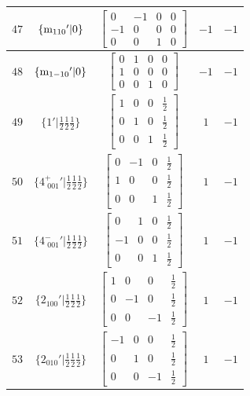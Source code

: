 \documentclass[fleqn,8pt]{jsarticle}
\begin{document}
\begin{longtable}{ccccc}
$ 47 $ & $ \{{\rm m}_{110}{}'|0\} $ & $ \begin{bmatrix} 0 & -1 & 0 & 0 \\ -1 & 0 & 0 & 0 \\ 0 & 0 & 1 & 0 \end{bmatrix} $ & $ -1 $ & $ -1 $ \\ \hline
$ 48 $ & $ \{{\rm m}_{1-10}{}'|0\} $ & $ \begin{bmatrix} 0 & 1 & 0 & 0 \\ 1 & 0 & 0 & 0 \\ 0 & 0 & 1 & 0 \end{bmatrix} $ & $ -1 $ & $ -1 $ \\ \hline
$ 49 $ & $ \{1{}'|\frac{1}{2} \frac{1}{2} \frac{1}{2}\} $ & $ \begin{bmatrix} 1 & 0 & 0 & \frac{1}{2} \\ 0 & 1 & 0 & \frac{1}{2} \\ 0 & 0 & 1 & \frac{1}{2} \end{bmatrix} $ & $ 1 $ & $ -1 $ \\ \hline
$ 50 $ & $ \{4^{+}_{\,\,001}{}'|\frac{1}{2} \frac{1}{2} \frac{1}{2}\} $ & $ \begin{bmatrix} 0 & -1 & 0 & \frac{1}{2} \\ 1 & 0 & 0 & \frac{1}{2} \\ 0 & 0 & 1 & \frac{1}{2} \end{bmatrix} $ & $ 1 $ & $ -1 $ \\ \hline
$ 51 $ & $ \{4^{-}_{\,\,001}{}'|\frac{1}{2} \frac{1}{2} \frac{1}{2}\} $ & $ \begin{bmatrix} 0 & 1 & 0 & \frac{1}{2} \\ -1 & 0 & 0 & \frac{1}{2} \\ 0 & 0 & 1 & \frac{1}{2} \end{bmatrix} $ & $ 1 $ & $ -1 $ \\ \hline
$ 52 $ & $ \{2{}_{100}{}'|\frac{1}{2} \frac{1}{2} \frac{1}{2}\} $ & $ \begin{bmatrix} 1 & 0 & 0 & \frac{1}{2} \\ 0 & -1 & 0 & \frac{1}{2} \\ 0 & 0 & -1 & \frac{1}{2} \end{bmatrix} $ & $ 1 $ & $ -1 $ \\ \hline
$ 53 $ & $ \{2{}_{010}{}'|\frac{1}{2} \frac{1}{2} \frac{1}{2}\} $ & $ \begin{bmatrix} -1 & 0 & 0 & \frac{1}{2} \\ 0 & 1 & 0 & \frac{1}{2} \\ 0 & 0 & -1 & \frac{1}{2} \end{bmatrix} $ & $ 1 $ & $ -1 $ \\ \hline

\end{longtable}
\end{document}
